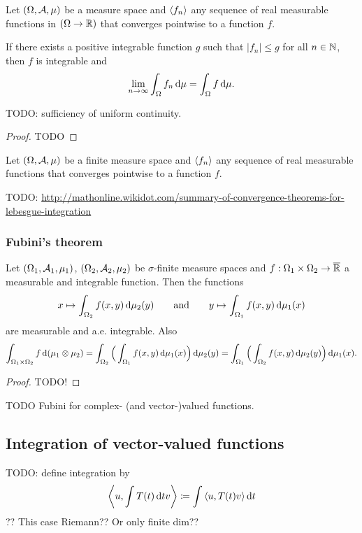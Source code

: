 \begin{theorem}
Let $\left( \Omega, \mathcal{A}, \mu \right)$ be a measure space and $\left\langle f_n \right\rangle$ any sequence of real measurable functions in $(\Omega\to\mathbb{R})$ that converges pointwise to a function $f$.

If there exists a positive integrable function $g$ such that $|f_n| \leq g$ for all $n\in \mathbb{N}$, then $f$ is integrable and
\[ \lim_{n\to \infty}\int_\Omega f_n \operatorname{d \!}{\mu} = \int_\Omega f\operatorname{d \!}{\mu}. \]
\end{theorem}
TODO: sufficiency of uniform continuity.
\begin{proof}
TODO
\end{proof}
\begin{corollary} \label{boundedConvergenceTheorem}
Let $\left( \Omega, \mathcal{A}, \mu \right)$ be a finite measure space and $\left\langle f_n \right\rangle$ any sequence of real measurable functions that converges pointwise to a function $f$.
\end{corollary}
TODO: \url{http://mathonline.wikidot.com/summary-of-convergence-theorems-for-lebesgue-integration}

\subsubsection{Fubini's theorem}
\begin{theorem}
Let $\left( \Omega_1, \mathcal{A}_1, \mu_1 \right)$, $\left( \Omega_2, \mathcal{A}_2, \mu_2 \right)$ be $\sigma$-finite measure spaces and $f: \Omega_1\times\Omega_2 \to \overline{\mathbb{R}}$ a measurable and integrable function. Then the functions
\[ x\mapsto \int_{\Omega_2}f(x,y)\operatorname{d \!}{\mu_2(y)} \qquad\text{and}\qquad y\mapsto \int_{\Omega_1}f(x,y)\operatorname{d \!}{\mu_1(x)} \]
are measurable and a.e. integrable. Also
\[ \int_{\Omega_1\times\Omega_2}f\operatorname{d \!}{(\mu_1\otimes\mu_2)} = \int_{\Omega_2}\Big(\int_{\Omega_1}f(x,y)\operatorname{d \!}{\mu_1(x)}\Big)\operatorname{d \!}{\mu_2(y)} = \int_{\Omega_1}\Big(\int_{\Omega_2}f(x,y)\operatorname{d \!}{\mu_2(y)}\Big)\operatorname{d \!}{\mu_1(x)}. \]
\end{theorem}
\begin{proof}
TODO!
\end{proof}

TODO Fubini for complex- (and vector-)valued functions.

\subsection{Integration of vector-valued functions}
TODO: define integration by
\[ \left\langle u, \int T(t)\operatorname{d \!}{t} v \right\rangle \coloneqq \int\left\langle u,T(t)v \right\rangle\operatorname{d \!}{t} \]
??
This case Riemann?? Or only finite dim??

